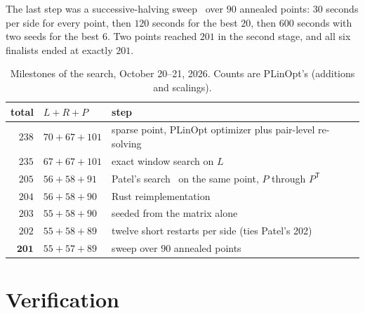 \documentclass[11pt]{article}
\theoremstyle{remark}
\newcommand{\Pt}{P^{\mathsf T}}
\begin{document}
The last step was a successive-halving sweep~\cite{JT16} over $90$
annealed points: $30$ seconds per side for every point, then $120$
seconds for the best $20$, then $600$ seconds with two seeds for the
best $6$.  Two points reached $201$ in the second stage, and all six
finalists ended at exactly $201$.

\begin{table}[ht]
\centering
\caption{Milestones of the search, October 20--21, 2026.  Counts are
PLinOpt's (additions and scalings).}\label{tab:history}
\small
\begin{tabular}{rlp{8.8cm}}
\toprule
total & $L+R+P$ & step \\
\midrule
$238$ & $70+67+101$ & sparse point, PLinOpt optimizer plus pair-level re-solving \\
$235$ & $67+67+101$ & exact window search on $L$ \\
$205$ & $56+58+91$ & Patel's search~\cite{Patel26} on the same point, $P$ through $\Pt$ \\
$204$ & $56+58+90$ & Rust reimplementation \\
$203$ & $55+58+90$ & seeded from the matrix alone \\
$202$ & $55+58+89$ & twelve short restarts per side (ties Patel's 202) \\
$\mathbf{201}$ & $55+57+89$ & sweep over $90$ annealed points \\
\bottomrule
\end{tabular}
\end{table}

\section{Verification}\label{sec:verify}
\end{document}

